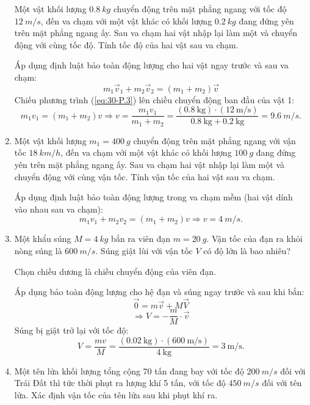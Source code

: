 \begin{enumerate}[label=\bfseries Câu \arabic*:, leftmargin=1.5cm]
	
	{
		Một vật khối lượng $\SI{0.8}{kg}$ chuyển động trên mặt phẳng ngang với tốc độ $\SI{12}{m/s}$, đến va chạm với một vật khác có khối lượng $\SI{0.2}{kg}$ đang đứng yên trên mặt phẳng ngang ấy. Sau va chạm hai vật nhập lại làm một và chuyển động với cùng tốc độ. Tính tốc độ của hai vật sau va chạm.
	}
	
	\hideall
	{	
		Áp dụng định luật bảo toàn động lượng cho hai vật ngay trước và sau va chạm:
		\begin{equation}
			\label{eq:30-P.3}
			m_1\vec v_1+m_2\vec v_2=\left(m_1+m_2\right)\vec v
		\end{equation}
	Chiếu phương trình (\ref{eq:30-P.3}) lên chiều chuyển động ban đầu của vật 1:
		$$m_1v_1= (m_1 + m_2) v \Rightarrow v=\dfrac{m_1v_1}{m_1+m_2}=\dfrac{\left(\SI{0.8}{\kilogram}\right)\cdot\left(\SI{12}{\meter/\second}\right)}{\SI{0.8}{\kilogram}+\SI{0.2}{\kilogram}}=\SI{9.6}{m/s}.$$
	}
	
	\item {}
	
	
	{
		Một vật khối lượng $m_1=\SI{400}{g}$ chuyển động trên mặt phẳng ngang với vận tốc $\SI{18}{km/h}$, đến va chạm với một vật khác có khối lượng $\SI{100}{g}$ đang đứng yên trên mặt phẳng ngang ấy. Sau va chạm hai vật nhập lại làm một và chuyển động với cùng vận tốc. Tính vận tốc của hai vật sau va chạm.
	}
	
	\hideall
	{	
		Áp dụng định luật bảo toàn động lượng trong va chạm mềm (hai vật dính vào nhau sau va chạm):
		$$m_1v_1 + m_2 v_2 = (m_1 + m_2) v \Rightarrow v=\SI{4}{m/s}.$$
	}
	\item {}
	
	
	{
		Một khẩu súng $M = \SI{4}{kg}$ bắn ra viên đạn $m = \SI{20}{g}$. Vận tốc của đạn ra khỏi nòng súng là $\SI{600}{m/s}$. Súng giật lùi với vận tốc $V$ có độ lớn là bao nhiêu?
	}
	
	\hideall
	{	
		Chọn chiều dương là chiều chuyển động của viên đạn.
		
		Áp dụng bảo toàn động lượng cho hệ đạn và súng ngay trước và sau khi bắn:
		\begin{equation}
			\label{eq:30-P.4}
			\vec 0=m\vec v+M\vec V
		\end{equation}
	$$\Rightarrow V=-\dfrac{m}{M}\cdot\vec v$$
	Súng bị giật trở lại với tốc độ:
	$$V=\dfrac{mv}{M}=\dfrac{\left(\SI{0.02}{\kilogram}\right)\cdot\left(\SI{600}{\meter/\second}\right)}{\SI{4}{\kilogram}}=\SI{3}{\meter/\second}.$$
	}
	\item {}
	
	
	{Một tên lửa khối lượng tổng cộng 70 tấn đang bay với tốc độ $\SI{200}{m/s}$ đối với Trái Đất thì tức thời phụt ra lượng khí 5 tấn, với tốc độ $\SI{450}{m/s}$ đối với tên lửa. Xác định vận tốc của tên lửa sau khi phụt khí ra.
	}
	

\end{enumerate}
